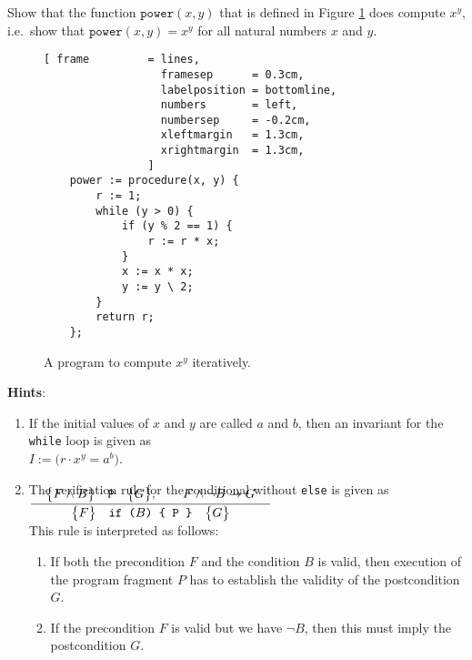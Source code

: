 \exercise
Show that the function $\texttt{power}(x,y)$ that is defined in Figure
\ref{fig:power-iterative.stlx} does compute $x^y$, i.e.~show that $\texttt{power}(x,y) = x^y$ 
for all natural numbers $x$ and $y$.


\begin{figure}[!h]
\centering
\begin{Verbatim}[ frame         = lines, 
                  framesep      = 0.3cm, 
                  labelposition = bottomline,
                  numbers       = left,
                  numbersep     = -0.2cm,
                  xleftmargin   = 1.3cm,
                  xrightmargin  = 1.3cm,
                ]
    power := procedure(x, y) {
        r := 1;
        while (y > 0) {
            if (y % 2 == 1) {
                r := r * x;
            }
            x := x * x;
            y := y \ 2;
        }
        return r;
    };
\end{Verbatim}
\vspace*{-0.3cm}
\caption{A program to compute $x^y$ iteratively.}
\label{fig:power-iterative.stlx}
\end{figure}


\noindent
\textbf{Hints}: 
\begin{enumerate}
\item If the initial values of $x$ and $y$ are called $a$ and $b$,
      then an invariant for the \texttt{while} loop is given as 
      \\[0.2cm]
      \hspace*{1.3cm}
      $I := \bigl(r \cdot x^y = a^b\bigr)$.
\item The verification rule for the conditional without \texttt{else} is given as
      \\[0.4cm]
      \hspace*{1.3cm}
      $\bruch{\quad\hoare{F \wedge B}{P}{G}, \qquad F \wedge \neg B \rightarrow G\quad}{
                     \hoare{F}{if ($B$) \{ P \}}{G}}
      $
      \\[0.2cm]
      This rule is interpreted as follows:
      \begin{enumerate}
      \item If both the precondition $F$ and the condition $B$ is valid, then execution of the
            program fragment $P$ has to establish the validity of the postcondition $G$.
      \item If the precondition $F$ is valid but we have $\neg B$, then this must imply the postcondition
            $G$.
      \end{enumerate}
\end{enumerate}

